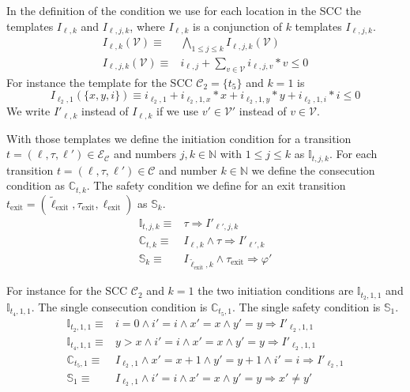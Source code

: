 In the definition of the condition we use for each location in the SCC the templates $I_{\ell,k}$ and $I_{\ell,j,k}$, where $I_{\ell,k}$ is a conjunction of $k$ templates $I_{\ell,j,k}$.
\begin{align}
  I_{\ell,k}(\mathcal{V}) \equiv & \bigwedge_{1 \leq j \leq k}{I_{\ell,j,k}(\mathcal{V})}\\
  I_{\ell,j,k}(\mathcal{V}) \equiv & i_{\ell,j} + \sum_{v \in \mathcal{V}}{i_{\ell,j,v} * v} \leq 0
\end{align}
For instance the template for the SCC $\mathcal{C}_2 = \lbrace t_5 \rbrace$ and $k=1$ is \[ I_{\ell_2,1}(\lbrace x, y, i \rbrace) \equiv i_{\ell_2,1} + i_{\ell_2,1,x} * x + i_{\ell_2,1,y} * y + i_{\ell_2,1,i} * i \leq 0 \]
We write $I'_{\ell,k}$ instead of $I_{\ell,k}$ if we use $v' \in \mathcal{V}'$ instead of $v \in \mathcal{V}$.

With those templates we define the initiation condition for a transition $t = (\ell, \tau, \ell') \in \mathcal{E}_\mathcal{C}$ and numbers $j, k \in \mathbb{N}$ with $1 \leq j \leq k$ as $\mathbb{I}_{t,j,k}$.
For each transition $t = (\ell, \tau, \ell') \in \mathcal{C}$ and number $k \in \mathbb{N}$ we define the consecution condition as $\mathbb{C}_{t,k}$.
The safety condition we define for an exit transition $t_\text{exit} = (\tilde{\ell}_\text{exit}, \tau_\text{exit}, \ell_\text{exit})$ as $\mathbb{S}_k$.
\begin{align}
  \mathbb{I}_{t,j,k} \equiv & \tau \Rightarrow I'_{\ell',j,k}\\
  \mathbb{C}_{t,k} \equiv & I_{\ell,k} \wedge \tau \Rightarrow I'_{\ell',k}\\
  \mathbb{S}_k \equiv & I_{\tilde{\ell}_\text{exit},k} \wedge \tau_\text{exit} \Rightarrow \varphi'
\end{align}

For instance for the SCC $\mathcal{C}_2$ and $k=1$ the two initiation conditions are $\mathbb{I}_{t_2, 1, 1}$ and $\mathbb{I}_{t_4, 1, 1}$.
The single consecution condition is $\mathbb{C}_{t_5, 1}$.
The single safety condition is $\mathbb{S}_1$.
\begin{align}
  \mathbb{I}_{t_2, 1, 1} \equiv & i = 0 \wedge i' = i \wedge x' = x \wedge y' = y \Rightarrow I'_{\ell_2,1,1}\\
  \mathbb{I}_{t_4, 1, 1} \equiv & y > x \wedge i' = i \wedge x' = x \wedge y' = y \Rightarrow I'_{\ell_2,1,1}\\
  \mathbb{C}_{t_5, 1} \equiv & I_{\ell_2,1} \wedge x' = x + 1 \wedge y' = y + 1 \wedge i' = i \Rightarrow I'_{\ell_2,1}\\
  \mathbb{S}_1 \equiv & I_{\ell_2,1} \wedge i' = i \wedge x' = x \wedge y' = y \Rightarrow x' \neq y'
\end{align}
  
